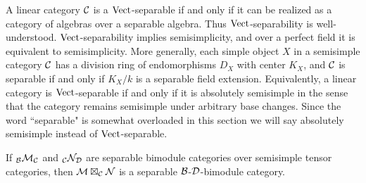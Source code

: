 \documentclass{amsart}
\begin{document}
A linear category $\mathcal C$ is a $\mathrm{Vect}$-separable if and only if it can be realized as a category of algebras over a separable algebra.  Thus $\mathrm{Vect}$-separability is well-understood.   $\mathrm{Vect}$-separability implies semisimplicity, and over a perfect field it is equivalent to semisimplicity.  More generally, each simple object $X$ in a semisimple category $\mathcal C$ has a division ring of endomorphisms $D_X$ with center $K_X$, and $\mathcal C$ is separable if and only if $K_X/k$ is a separable field extension.  Equivalently, a linear category is $\mathrm{Vect}$-separable if and only if it is absolutely semisimple in the sense that the category remains semisimple under arbitrary base changes.  Since the word ``separable" is somewhat overloaded in this section we will say absolutely semisimple instead of $\mathrm{Vect}$-separable.

\begin{theorem} \label{thm:compositeOfSep}
	If ${}_\mathcal B\mathcal M_\mathcal C$ and ${}_\mathcal C\mathcal N_\mathcal D$ are separable bimodule categories over semisimple tensor categories, then $\mathcal M \boxtimes_{\mathcal C} \mathcal N$ is a separable $\mathcal B$-$\mathcal D$-bimodule category.
\end{theorem}
\end{document}
